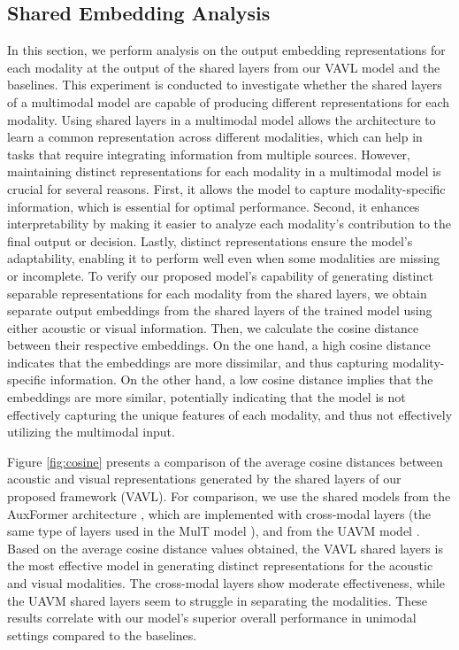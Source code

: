 \documentclass{article}
\begin{document}
\subsection{Shared Embedding Analysis}
\label{ssec:embeddingAnalysis}
In this section, we perform analysis on the output embedding representations for each modality at the output of the shared layers from our VAVL model and the baselines. This experiment is conducted to investigate whether the shared layers of a multimodal model are capable of producing different representations for each modality. Using shared layers in a multimodal model allows the architecture to learn a common representation across different modalities, which can help in tasks that require integrating information from multiple sources. However, maintaining distinct representations for each modality in a multimodal model is crucial for several reasons. First, it allows the model to capture modality-specific information, which is essential for optimal performance. Second, it enhances interpretability by making it easier to analyze each modality's contribution to the final output or decision. Lastly, distinct representations ensure the model's adaptability, enabling it to perform well even when some modalities are missing or incomplete. To verify our proposed model's capability of generating distinct separable representations for each modality from the shared layers, we obtain separate output embeddings from the shared layers of the trained model using either acoustic or visual information. Then, we calculate the cosine distance between their respective embeddings. On the one hand, a high cosine distance indicates that the embeddings are more dissimilar, and thus capturing modality-specific information. On the other hand, a low cosine distance implies that the embeddings are more similar, potentially indicating that the model is not effectively capturing the unique features of each modality, and thus not effectively utilizing the multimodal input.  

Figure \ref{fig:cosine} presents a comparison of the average cosine distances between acoustic and visual representations generated by the shared layers of our proposed framework (VAVL). For comparison, we use the shared models from the AuxFormer architecture \cite{Goncalves_2022}, which are implemented with cross-modal layers (the same type of layers used in the MulT model \cite{Tsai_2019}), and from the UAVM model \cite{gong_2022}. Based on the average cosine distance values obtained, the VAVL shared layers is the most effective model in generating distinct representations for the acoustic and visual modalities. The cross-modal layers show moderate effectiveness, while the UAVM shared layers seem to struggle in separating the modalities. These results correlate with our model's superior overall performance in unimodal settings compared to the baselines.
\end{document}
